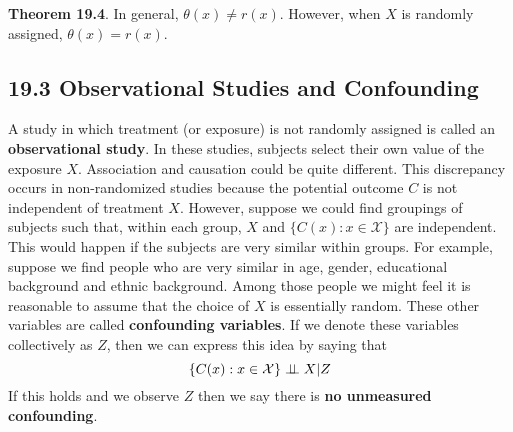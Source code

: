 \textbf{Theorem 19.4}. In general, \(\theta(x) \neq r(x)\). However,
when \(X\) is randomly assigned, \(\theta(x) = r(x)\).

\subsection*{19.3 Observational Studies and Confounding}\label{observational-studies-and-confounding}
A study in which treatment (or exposure) is not randomly assigned is
called an \textbf{observational study}. In these studies, subjects
select their own value of the exposure \(X\). Association and causation
could be quite different. This discrepancy occurs in non-randomized
studies because the potential outcome \(C\) is not independent of
treatment \(X\).
However, suppose we could find groupings of subjects such that, within
each group, \(X\) and \(\{ C(x) : x \in \mathcal{X} \}\) are
independent. This would happen if the subjects are very similar within
groups. For example, suppose we find people who are very similar in age,
gender, educational background and ethnic background. Among those people
we might feel it is reasonable to assume that the choice of \(X\) is
essentially random. These other variables are called \textbf{confounding
variables}. If we denote these variables collectively as \(Z\), then we
can express this idea by saying that
\[
\{ C(x) : x \in \mathcal{X} \} \perp\!\!\!\perp X | Z
\]
If this holds and we observe \(Z\) then we say there is \textbf{no
unmeasured confounding}.

